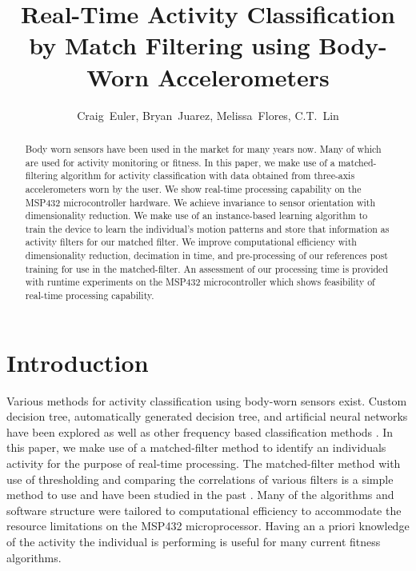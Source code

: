 \documentclass[journal]{IEEEtran}
\begin{document}
%
\title{Real-Time Activity Classification by Match Filtering using Body-Worn Accelerometers}
%
\author{Craig~Euler, Bryan~Juarez, Melissa~Flores, C.T.~Lin}
%
\maketitle
%
\begin{abstract}
Body worn sensors have been used in the market for many years now.
Many of which are used for activity monitoring or fitness.
In this paper, we make use of a matched-filtering algorithm for activity classification with data obtained from three-axis accelerometers worn by the user.
We show real-time processing capability on the MSP432 microcontroller hardware.
We achieve invariance to sensor orientation with dimensionality reduction.
We make use of an instance-based learning algorithm to train the device to learn the individual's motion patterns and store that information as activity filters for our matched filter.
We improve computational efficiency with dimensionality reduction, decimation in time, and pre-processing of our references post training for use in the matched-filter.
An assessment of our processing time is provided with runtime experiments on the MSP432 microcontroller which shows feasibility of real-time processing capability.
\end{abstract}
%
\section{Introduction}
Various methods for activity classification using body-worn sensors exist.
Custom decision tree, automatically generated decision tree, and artificial neural networks \cite{parkka_ermes_korpipaa_mantyjarvi_peltola_korhonen_2006} have been explored as well as other frequency based classification methods \cite{sharma_purwar_lee_lee_chung_2008}.
In this paper, we make use of a matched-filter method to identify an individual\textquotesingle s activity for the purpose of real-time processing.
The matched-filter method with use of thresholding and comparing the correlations of various filters is a simple method to use and have been studied in the past \cite{giannakis_tsatsanis_1990}.
Many of the algorithms and software structure were tailored to computational efficiency to accommodate the resource limitations on the MSP432 microprocessor.
Having an a priori knowledge of the activity the individual is performing is useful for many current fitness algorithms.
\end{document}
